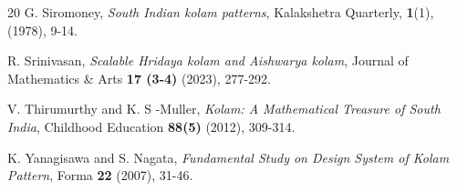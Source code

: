 \documentclass[12pt,a4paper]{article}
\theoremstyle{remark} %
\theoremstyle{example} %
\theoremstyle{proposition}
\begin{document}
\begin{thebibliography}{20}
         {\sc G. Siromoney},
         {\it South Indian kolam patterns},
         {Kalakshetra Quarterly}, {\bf1}(1), (1978), 9-14.

         {\sc R. Srinivasan},
         {\it Scalable Hridaya kolam and Aishwarya kolam},
         {Journal of Mathematics \& Arts} {\bf 17 (3-4)} (2023), 277-292.

         {\sc V. Thirumurthy and K. S -Muller},
         {\it Kolam: A Mathematical Treasure of South India},
         {Childhood Education} {\bf 88(5)} (2012), 309-314.

         {\sc K. Yanagisawa and S. Nagata},
         {\it Fundamental Study on Design System of Kolam Pattern},
         {Forma} {\bf 22} (2007), 31-46.



\end{thebibliography}
\end{document}
